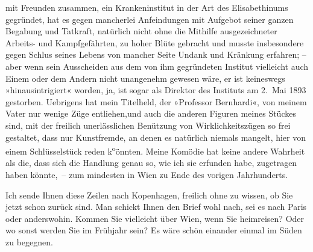                mit Freunden zusammen, ein Krankeninstitut in der Art des Elisabethinums gegründet, hat es gegen
               mancherlei Anfeindungen mit Aufgebot seiner ganzen Begabung und Tatkraft, natürlich
               nicht ohne die Mithilfe ausgezeichneter Arbeits- und Kampfgefährten, zu hoher Blüte
               gebracht und musste insbesondere gegen Schlus seines Lebens von mancher Seite Undank
               und Kränkung erfahren; – aber wenn sein Ausscheiden aus dem von ihm gegründeten
               Institut vielleicht auch Einem oder dem Andern nicht unangenehm gewesen wäre, er ist
               keineswegs »hinausintrigiert« worden, ja,  ist
               sogar als Direktor des Instituts
               am 2. Mai 1893 gestorben. Uebrigens hat mein Titelheld, der »Professor Bernhardi«, von
               meinem Vater nur wenige Züge
               entliehen,und auch die anderen Figuren meines Stückes sind, mit der freilich
               unerlässlichen Benützung von Wirklichkeitszügen so frei gestaltet, dass nur
               Kunstfremde, an denen es natürlich {\pb}niemals
               mangelt, hier von einem Schlüsselstück reden k\substVorne{}\textsuperscript{o}\substDazwischen{}ö\substHinten{}nnten. Meine Komödie
               hat keine andere Wahrheit als die, dass sich die Handlung genau so, wie ich sie
                  erfunden\strikeout{,} habe, zugetragen haben könnte, – zum
               mindesten in Wien zu Ende des vorigen
               Jahrhunderts.\pend
           
\pstart
           Ich sende Ihnen diese Zeilen nach Kopenhagen,
               freilich ohne zu wissen, ob Sie jetzt schon zurück sind. Man schickt Ihnen den Brief
               wohl nach, sei es nach Paris oder anderswohin.
               Kommen Sie vielleicht über Wien, wenn Sie
               heimreisen? Oder wo sonst werden Sie im Frühjahr sein? Es wäre schön einander einmal
               im Süden zu begegnen.\pend
           
